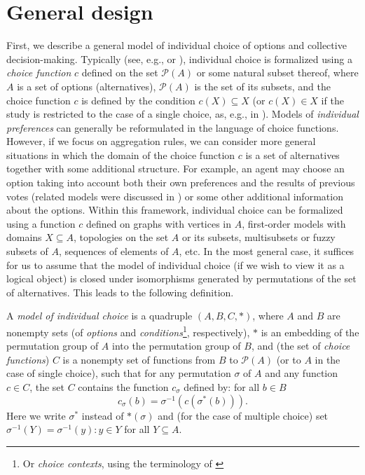 \documentclass[graybox]{SNmult}
\theoremstyle{definition}
\begin{document}
\section{General design}
First, we describe a general model of individual choice of options and collective decision-making. Typically (see, e.g., \cite{Aleskerov1,Aleskerov2,Aleskerov3,Aleskerov 2024} or \cite{Hand}), individual choice is formalized using a \textit{choice function} $c$ defined on the set $\mathscr P(A)$ or some natural subset thereof, where $A$ is a set of options (alternatives), $\mathscr P(A)$ is the set of its subsets, and the choice function $c$ is defined by the condition $c(X)\subseteq X$ (or $c(X)\in X$ if the study is restricted to the case of a single choice, as, e.g., in \cite{Shelah}). Models of \textit{individual preferences} can generally be reformulated in the language of choice functions. However, if we focus on aggregation rules, we can consider more general situations in which the domain of the choice function $c$ is a set of alternatives together with some additional structure. For example, an agent may choose an option taking into account both their own preferences and the results of previous votes (related models were discussed in \cite{Polyakov_Shamolin_nonlocal}) or some other additional information about the options. Within this framework, individual choice can be formalized using a function $c$ defined on graphs with vertices in $A$, first-order models with domains $X\subseteq A$, topologies on the set $A$ or its subsets, multisubsets or fuzzy subsets of $A$, sequences of elements of $A$, etc. In the most general case, it suffices for us to assume that the model of individual choice (if we wish to view it as a logical object) is closed under isomorphisms generated by permutations of the set of alternatives. This leads to the following definition.


\begin{definition}
	A \textit{model of individual choice} is a quadruple $(A, B, C, \ast)$, where $A$ and $B$ are nonempty sets (of \textit{options} and \textit{conditions}\footnote{Or \textit{choice contexts}, using the terminology of \cite{Aleskerov 2024}}, respectively), $\ast$ is an embedding of the permutation group of $A$ into the permutation group of $B$, and (the set of \textit{choice functions}) $C$ is a nonempty set of functions from $B$ to $\mathscr P(A)$ (or to $A$ in the case of single choice), such that for any permutation $\sigma$ of $A$ and any function $c\in C$, the set $C$ contains the function $c_\sigma$ defined by: for all $b\in B$
	$$
	c_\sigma (b)=\sigma^{-1}(  c(\sigma^\ast(b))).
	$$
	Here we write $\sigma^\ast$ instead of $\ast(\sigma)$ and (for the case of multiple choice) set $\sigma^{-1}(Y)={\sigma^{-1}(y): y\in Y}$ for all $Y\subseteq A$.
\end{definition}
\end{document}
